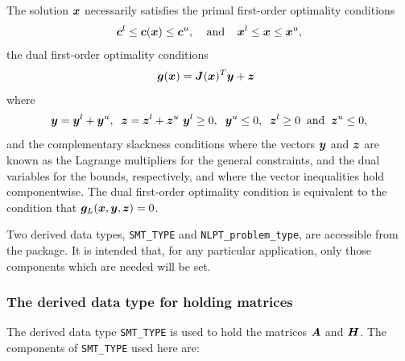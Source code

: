 \documentclass{galahad}
\newcommand{\packagename}{NLPT}
\begin{document}
The solution ${\bm{x}}$ necessarily satisfies 
the primal first-order optimality conditions
\[
{\bm{c}}^l \leq {\bm{c}}({\bm{x}}) \leq {\bm{c}}^u,
\;\;\;\; \mbox{and} \;\;\;\;
{\bm{x}}^l \leq {\bm{x}} \leq {\bm{x}}^u,
\]
the dual first-order optimality conditions
\[
{\bm{g}}( {\bm{x}} ) = {\bm{J}}({\bm{x}})^{T} {\bm{y}} + {\bm{z}} \;\;
\]
where
\[
{\bm{y}} = {\bm{y}}^{l} + {\bm{y}}^{u}, \;\;
 {\bm{z}} = {\bm{z}}^{l} + {\bm{z}}^{u}\,\,
 {\bm{y}}^{l} \geq 0 , \;\;
 {\bm{y}}^{u} \leq 0 , \;\;
 {\bm{z}}^{l} \geq 0 \;\; \mbox{and} \;\;
 {\bm{z}}^{u} \leq 0 ,
\]
and the complementary slackness conditions 
where the vectors ${\bm{y}}$ and ${\bm{z}}$ are 
known as the Lagrange multipliers for
the general constraints, and the dual variables for the bounds,
respectively, and where the vector inequalities hold componentwise.
The dual first-order optimality condition is equivalent to
the condition that ${\bm{g}}_L( {\bm{x}},{\bm{y}}, {\bm{z}}) = 0$.





\galtype
Two derived data types,
{\tt SMT\_TYPE} and
{\tt \packagename\_problem\_type},
are accessible from the package. It is intended that, for any particular
application, only those components which are needed will be set.


\subsubsection{The derived data type for holding matrices}\label{typesmt}
The derived data type {\tt SMT\_TYPE} is used to hold the matrices ${\bm{A}}$
and ${\bm{H}}$. The components of {\tt SMT\_TYPE} used here are:
\end{document}
